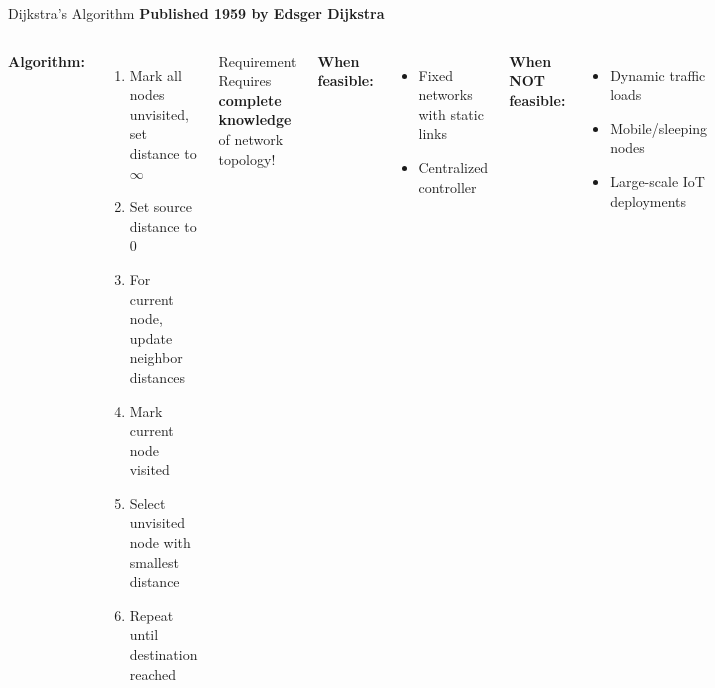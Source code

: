 \documentclass[aspectratio=169,11pt]{beamer}
\begin{document}
\begin{frame}{Dijkstra's Algorithm}
    \textbf{Published 1959 by Edsger Dijkstra}
    
    \vspace{0.3cm}
    \begin{columns}
        \textbf{Algorithm:}
        \begin{enumerate}
            \item Mark all nodes unvisited, set distance to $\infty$
            \item Set source distance to 0
            \item For current node, update neighbor distances
            \item Mark current node visited
            \item Select unvisited node with smallest distance
            \item Repeat until destination reached
        \end{enumerate}
        
        \begin{alertblock}{Requirement}
            Requires \textbf{complete knowledge} of network topology!
        \end{alertblock}
        
        \vspace{0.3cm}
        \textbf{When feasible:}
        \begin{itemize}
            \item Fixed networks with static links
            \item Centralized controller
        \end{itemize}
        
        \textbf{When NOT feasible:}
        \begin{itemize}
            \item Dynamic traffic loads
            \item Mobile/sleeping nodes
            \item Large-scale IoT deployments
        \end{itemize}
    \end{columns}
\end{frame}
\end{document}
